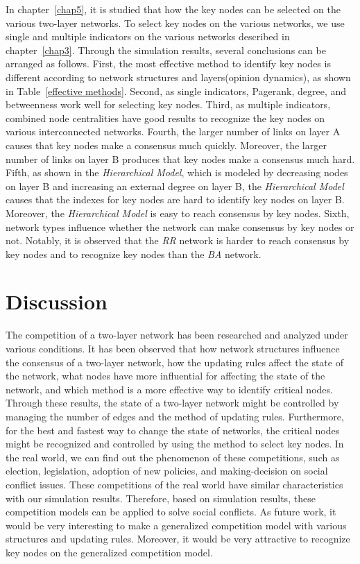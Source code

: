 In chapter~\ref{chap5}, it is studied that how the key nodes can be selected on the various two-layer networks. To select key nodes on the various networks, we use single and multiple indicators on the various networks described in chapter~\ref{chap3}. Through the simulation results, several conclusions can be arranged as follows. First, the most effective method to identify key nodes is different according to network structures and layers(opinion dynamics), as shown in Table~\ref{effective methods}. Second, as single indicators, Pagerank, degree, and betweenness work well for selecting key nodes. Third, as multiple indicators, combined node centralities have good results to recognize the key nodes on various interconnected networks. Fourth, the larger number of links on layer A causes that key nodes make a consensus much quickly. Moreover, the larger number of links on layer B produces that key nodes make a consensus much hard. Fifth, as shown in the \textit{Hierarchical Model}, which is modeled by decreasing nodes on layer B and increasing an external degree on layer B, the \textit{Hierarchical Model} causes that the indexes for key nodes are hard to identify key nodes on layer B. Moreover, the \textit{Hierarchical Model} is easy to reach consensus by key nodes. Sixth, network types influence whether the network can make consensus by key nodes or not. Notably, it is observed that the \textit{RR} network is harder to reach consensus by key nodes and to recognize key nodes than the \textit{BA} network. \\
  
\section{Discussion} 
The competition of a two-layer network has been researched and analyzed under various conditions. It has been observed that how network structures influence the consensus of a two-layer network, how the updating rules affect the state of the network, what nodes have more influential for affecting the state of the network, and which method is a more effective way to identify critical nodes. Through these results, the state of a two-layer network might be controlled by managing the number of edges and the method of updating rules. Furthermore, for the best and fastest way to change the state of networks, the critical nodes might be recognized and controlled by using the method to select key nodes.
In the real world, we can find out the phenomenon of these competitions, such as election, legislation, adoption of new policies, and making-decision on social conflict issues. These competitions of the real world have similar characteristics with our simulation results. Therefore, based on simulation results, these competition models can be applied to solve social conflicts. As future work, it would be very interesting to make a generalized competition model with various structures and updating rules. Moreover, it would be very attractive to recognize key nodes on the generalized competition model.\\   

